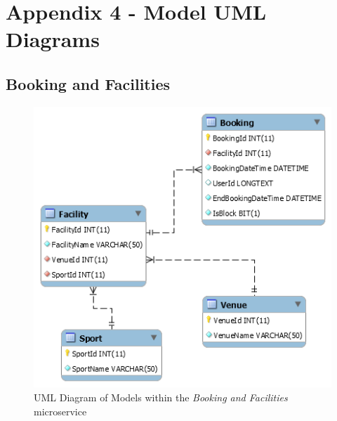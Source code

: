\section{Appendix 4 - Model UML Diagrams}


\subsection{Booking and Facilities}
\begin{figure}[H]
    \centering
    \includegraphics[width=\textwidth]{Images/db_uml/booking-facilities.png}
    \caption{UML Diagram of Models within the \textit{Booking and Facilities} microservice}
    \label{fig:db_uml:booking-facilities}
\end{figure}

